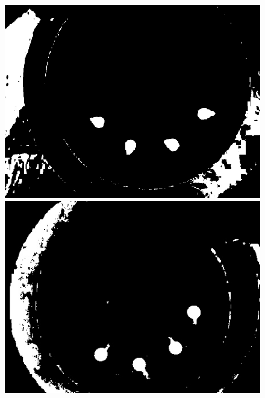 \documentclass[a4paper]{ctexart}
\begin{document}
\begin{figure}[htbp]
\begin{minipage}[t]{0.25\textwidth}
		\includegraphics[width=\textwidth]{figure/threshold/img3.jpg}
	\end{minipage}
	\begin{minipage}[t]{0.25\textwidth}
		\centering
		\includegraphics[width=\textwidth]{figure/threshold/img4.jpg}
	\end{minipage}
	\begin{minipage}[t]{0.25\textwidth}
		\centering

\end{minipage}
\end{figure}
\end{document}

